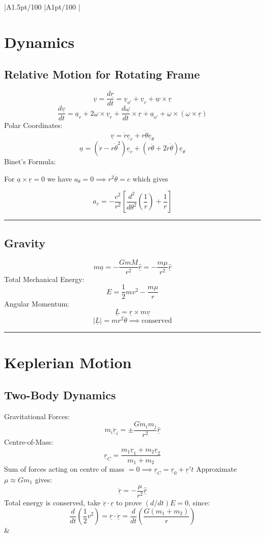 \documentclass[table,cmyk]{article}
\makeatletter
\newcommand\ratio[2]{\strip@pt\dimexpr#1pt/#2\relax}
\makeatother
\begin{document}
\begin{longtable}
{
    |A{1.5}{\ratio{50}{100}}%
    |A{1}{\ratio{50}{100}}%
    |%
}\hline
\section*{Dynamics}
\subsection*{Relative Motion for Rotating Frame}
\[\underline{v} = \frac{d \underline{r}}{d t} = \underline{v}_{o'} + \underline{v}_r + \underline{w} \times \underline{r}\]
\[ \frac{d\underline{v}}{dt} = \underline{a}_r + 2\underline{\omega}\times\underline{v}_r + \frac{d\underline{\omega}}{dt}\times\underline{r}+\underline{a}_{o'}+\underline{\omega}\times(\underline{\omega}\times\underline{r})\]
Polar Coordinates:
\[\underline{v} = \dot{r}\underline{e}_r + r\dot{\theta}\underline{e}_{\theta}\]
\[\underline{a} = (\ddot{r}-r\dot{\theta}^2)\underline{e}_r + (r\ddot{\theta} + 2\dot{r}\dot{\theta})\underline{e}_{\theta}\]
Binet's Formula:

For $\underline{a} \times \underline{r} = 0$ we have $a_{\theta} = 0 \implies r^2 \dot{\theta} = c$ which gives

\[a_r = -\frac{c^2}{r^2}\left[\frac{d^2}{d\theta^2}\left(\frac{1}{r}\right)+\frac{1}{r}\right]\]

\vspace{0.5cm}
\noindent\rule{9cm}{0.4pt}
\subsection*{Gravity}
\[m\underline{a} = -\frac{GmM}{r^2}\underline{\hat{r}} = -\frac{m\mu}{r^2}\underline{\hat{r}}\]
Total Mechanical Energy:
\[E = \frac{1}{2}mv^2 - \frac{m\mu}{r}\]
Angular Momentum:
\[\underline{L} = \underline{r}\times m \underline{v} \]
\[|\underline{L}| = mr^2\dot{\theta} \implies \text{conserved}\]

\vspace{0.5cm}
\noindent\rule{9cm}{0.4pt}
\section*{Keplerian Motion}
\subsection*{Two-Body Dynamics}
Gravitational Forces:
\[m_i\ddot{\underline{r}}_i=\pm \frac{Gm_im_j}{r^2}\underline{\hat{r}}\]
Centre-of-Mass:
\[\underline{r}_C = \frac{m_1\underline{r}_1 + m_2\underline{r}_2}{m_1+m_2}\]
Sum of forces acting on centre of mass $= 0 \implies \underline{r}_C = \underline{r}_0 + \underline{r}'t$
Approximate $\mu \approx Gm_1$ gives:
\[\ddot{\underline{r}} = -\frac{\mu}{r^2}\underline{\hat{r}}\]
Total energy is conserved, take $\ddot{\underline{r}}\cdot\underline{r}$ to prove $(d/dt) E = 0$, since:
\[\frac{d}{dt}\left(\frac{1}{2}v^2\right) = \underline{\ddot{r}}\cdot\underline{\dot{r}} =  \frac{d}{dt}\left(\frac{G(m_1+m_2)}{r}\right)\]
&

\end{longtable}
\end{document}
